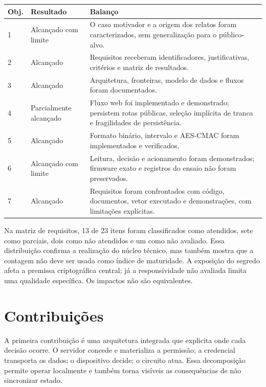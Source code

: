 \begin{quadro}[htbp]
    \caption{Balanço dos objetivos específicos}
    \label{qua:objetivos-finais}
    \small
    \begin{tabular}{|p{}|p{}|p{}|}
        \hline
        \textbf{Obj.} & \textbf{Resultado} & \textbf{Balanço} \\ \hline
        1 & Alcançado com limite & O caso motivador e a origem dos relatos foram caracterizados, sem generalização para o público-alvo. \\ \hline
        2 & Alcançado & Requisitos receberam identificadores, justificativas, critérios e matriz de resultados. \\ \hline
        3 & Alcançado & Arquitetura, fronteiras, modelo de dados e fluxos foram documentados. \\ \hline
        4 & Parcialmente alcançado & Fluxo web foi implementado e demonstrado; persistem rotas públicas, seleção implícita de tranca e fragilidades de persistência. \\ \hline
        5 & Alcançado & Formato binário, intervalo e AES-CMAC foram implementados e verificados. \\ \hline
        6 & Alcançado com limite & Leitura, decisão e acionamento foram demonstrados; firmware exato e registros do ensaio não foram preservados. \\ \hline
        7 & Alcançado & Requisitos foram confrontados com código, documentos, vetor executado e demonstrações, com limitações explícitas. \\ \hline
    \end{tabular}
\end{quadro}

Na matriz de requisitos, 13 de 23 itens foram classificados como atendidos, sete como parciais, dois como não atendidos e um como não avaliado. Essa distribuição confirma a realização do núcleo técnico, mas também mostra que a contagem não deve ser usada como índice de maturidade. A exposição do segredo afeta a premissa criptográfica central; já a responsividade não avaliada limita uma qualidade específica. Os impactos não são equivalentes.

\section{Contribuições}

A primeira contribuição é uma arquitetura integrada que explicita onde cada decisão ocorre. O servidor concede e materializa a permissão; a credencial transporta os dados; o dispositivo decide; o circuito atua. Essa decomposição permite operar localmente e também torna visíveis as consequências de não sincronizar estado.

